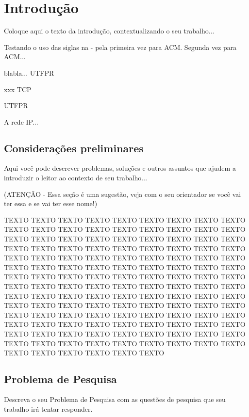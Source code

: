 \chapter{Introdução}
\label{cap:introducao}

Coloque aqui o texto da introdução, contextualizando o seu trabalho...

Testando o uso das siglas na - pela primeira vez para \gls{ACM}. Segunda vez para \gls{ACM}...

blabla... \gls{UTFPR}

xxx \gls{TCP}

\acrlong{UTFPR}

A rede \gls{IP}...

\section{Considerações preliminares}

Aqui você pode descrever problemas, soluções e outros assuntos que ajudem a introduzir o leitor ao contexto de seu trabalho...

(ATENÇÃO - Essa seção é uma sugestão, veja com o seu orientador se você vai ter essa e se vai ter esse nome!)

TEXTO TEXTO TEXTO TEXTO TEXTO TEXTO TEXTO TEXTO TEXTO TEXTO TEXTO TEXTO TEXTO TEXTO TEXTO TEXTO TEXTO TEXTO TEXTO TEXTO TEXTO TEXTO TEXTO TEXTO TEXTO TEXTO TEXTO TEXTO TEXTO TEXTO TEXTO TEXTO TEXTO TEXTO TEXTO TEXTO TEXTO TEXTO TEXTO TEXTO TEXTO TEXTO TEXTO TEXTO TEXTO TEXTO TEXTO TEXTO TEXTO TEXTO TEXTO TEXTO TEXTO TEXTO TEXTO TEXTO TEXTO TEXTO TEXTO TEXTO TEXTO TEXTO TEXTO TEXTO TEXTO TEXTO TEXTO TEXTO TEXTO TEXTO TEXTO TEXTO TEXTO TEXTO TEXTO TEXTO TEXTO TEXTO TEXTO TEXTO TEXTO TEXTO TEXTO TEXTO TEXTO TEXTO TEXTO TEXTO TEXTO TEXTO TEXTO TEXTO TEXTO TEXTO TEXTO TEXTO TEXTO TEXTO TEXTO TEXTO TEXTO TEXTO TEXTO TEXTO TEXTO TEXTO TEXTO TEXTO TEXTO TEXTO TEXTO TEXTO TEXTO TEXTO TEXTO TEXTO TEXTO TEXTO TEXTO TEXTO TEXTO TEXTO TEXTO TEXTO TEXTO TEXTO TEXTO TEXTO TEXTO TEXTO TEXTO TEXTO

\section{Problema de Pesquisa}
\label{cap:introducao:sec:problema:pesquisa}

Descreva o seu Problema de Pesquisa com as questões de pesquisa que seu trabalho irá tentar responder.

